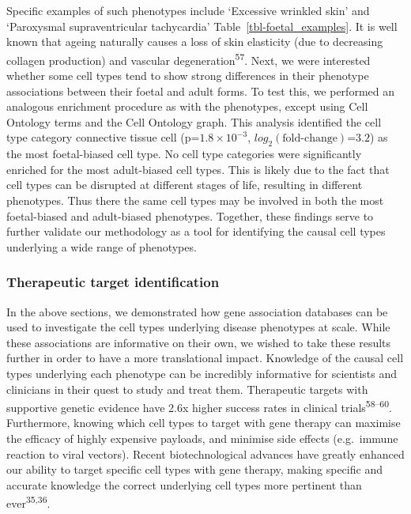 \documentclass[
]{article}
\begin{document}
Specific examples of such phenotypes include `Excessive wrinkled skin'
and `Paroxysmal supraventricular tachycardia'
Table~\ref{tbl-foetal_examples}. It is well known that ageing naturally
causes a loss of skin elasticity (due to decreasing collagen production)
and vascular degeneration\textsuperscript{57}. Next, we were interested
whether some cell types tend to show strong differences in their
phenotype associations between their foetal and adult forms. To test
this, we performed an analogous enrichment procedure as with the
phenotypes, except using Cell Ontology terms and the Cell Ontology
graph. This analysis identified the cell type category connective tissue
cell (p=\(1.8 \times 10^{-3}\), \(log_2(\text{fold-change})\)=\(3.2\))
as the most foetal-biased cell type. No cell type categories were
significantly enriched for the most adult-biased cell types. This is
likely due to the fact that cell types can be disrupted at different
stages of life, resulting in different phenotypes. Thus there the same
cell types may be involved in both the most foetal-biased and
adult-biased phenotypes. Together, these findings serve to further
validate our methodology as a tool for identifying the causal cell types
underlying a wide range of phenotypes.

\subsubsection{Therapeutic target
identification}\label{therapeutic-target-identification}

In the above sections, we demonstrated how gene association databases
can be used to investigate the cell types underlying disease phenotypes
at scale. While these associations are informative on their own, we
wished to take these results further in order to have a more
translational impact. Knowledge of the causal cell types underlying each
phenotype can be incredibly informative for scientists and clinicians in
their quest to study and treat them. Therapeutic targets with supportive
genetic evidence have 2.6x higher success rates in clinical
trials\textsuperscript{58--60}. Furthermore, knowing which cell types to
target with gene therapy can maximise the efficacy of highly expensive
payloads, and minimise side effects (e.g.~immune reaction to viral
vectors). Recent biotechnological advances have greatly enhanced our
ability to target specific cell types with gene therapy, making specific
and accurate knowledge the correct underlying cell types more pertinent
than ever\textsuperscript{35,36}.
\end{document}
